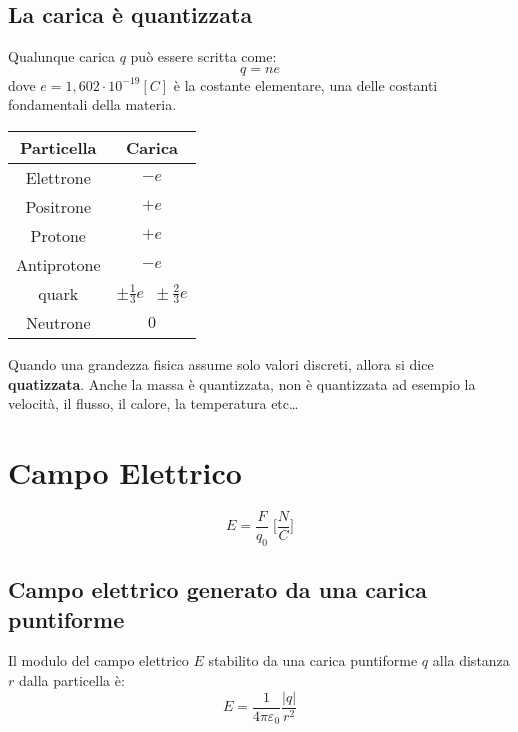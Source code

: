         \subsection{La carica è quantizzata} Qualunque carica $q$ può essere
        scritta come:
            \begin{equation}
                q = ne
            \end{equation}
        dove $e = 1,602\cdot10^{-19} [C]$ è la costante elementare, una delle
        costanti fondamentali della materia.
        \begin{center}
            \begin{tabular}{ |c|c| } 
                \hline
                Particella & Carica \\
                \hline
                Elettrone & $- e$ \\
                Positrone & $+ e$ \\
                Protone & $+ e$ \\
                Antiprotone & $- e$ \\
                quark & $\pm \frac{1}{3}e \;\; \pm \frac{2}{3}e$ \\
                Neutrone & $0$ \\
                \hline
            \end{tabular}
        \end{center}
        Quando una grandezza fisica assume solo valori discreti, allora si dice
        \textbf{quatizzata}. Anche la massa è quantizzata, non è quantizzata ad
        esempio la velocità, il flusso, il calore, la temperatura etc\dots

        \section{Campo Elettrico}
            \begin{equation}
                E = \frac{F}{q_0}\;\Bigg[\frac{N}{C}\Bigg]
            \end{equation}

            \subsection{Campo elettrico generato da una carica puntiforme} Il 
            modulo del campo elettrico $E$ stabilito da una carica puntiforme 
            $q$ alla distanza $r$ dalla particella è:
                \begin{equation}
                    E = \frac{1}{4\pi\varepsilon_0}\frac{|q|}{r^2}
                \end{equation}

